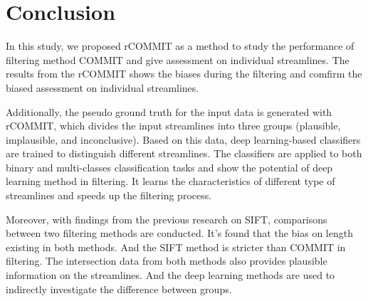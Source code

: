 \chapter{Conclusion}
In this study, we proposed rCOMMIT as a method to study the performance of 
filtering method COMMIT and give assessment on individual streamlines. 
The results from the rCOMMIT shows the biases during the filtering and comfirm the 
biased assessment on individual streamlines. 

Additionally, the pseudo ground truth for the input data is generated with rCOMMIT,
which divides the input streamlines into three groups (plausible, implausible, and inconclusive).
Based on this data, deep learning-based classifiers are trained to distinguish different streamlines.
The classifiers are applied to both binary and multi-classes classification tasks and 
show the potential of deep learning method in filtering. 
It learns the characteristics of different type of streamlines 
and speeds up the filtering process.  

Moreover, with findings from the previous research on SIFT, comparisons between two filtering
methods are conducted. It's found that the bias on length existing in both methods.
And the SIFT method is stricter than COMMIT in filtering. The intersection data from both methods also
provides plausible information on the streamlines. And the deep learning methods are used to 
indirectly investigate the difference between groups. 

